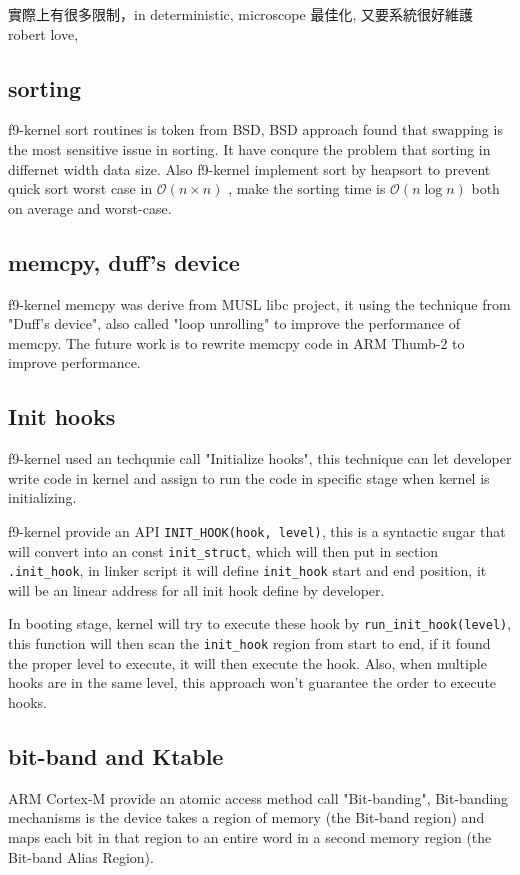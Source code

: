 \documentclass[10pt,preprint,nocopyrightspace]{sigplanconf}
\begin{document}
實際上有很多限制，in deterministic, microscope 最佳化, 又要系統很好維護
robert love,

\subsection{sorting}
f9-kernel sort routines is token from BSD\cite{bentley1993engineering}, BSD approach found that swapping is the most sensitive issue in sorting. It have conqure the problem that sorting in differnet width data size. Also f9-kernel implement sort by heapsort to prevent quick sort worst case in $\mathcal{O}(n \times n)$ , make the sorting time is $\mathcal{O}(n\log{}n)$  both on average and worst-case.

\subsection{memcpy, duff's device}
f9-kernel memcpy was derive from MUSL libc project\cite{felker}, it using the technique from "Duff's device", also called "loop unrolling" to improve the performance of memcpy. The future work is to rewrite memcpy code in ARM Thumb-2 to improve performance.

\subsection{Init hooks}

f9-kernel used an techqunie call "Initialize hooks", this technique can let developer write code in kernel and assign to run the code in specific stage when kernel is initializing.

f9-kernel provide an API \verb|INIT_HOOK(hook, level)|, this is a syntactic sugar that will convert into an const \verb|init_struct|, which will then put in section \verb|.init_hook|, in linker script it will define \verb|init_hook| start and end position, it will be an linear address for all init hook define by developer.

In booting stage, kernel will try to execute these hook by \verb|run_init_hook(level)|, this function will then scan the \verb|init_hook| region from start to end, if it found the proper level to execute, it will then execute the hook. Also, when multiple hooks are in the same level, this approach won't guarantee the order to execute hooks.

\subsection{bit-band and Ktable}
ARM Cortex-M provide an atomic access method call "Bit-banding", Bit-banding mechanisms is the device takes a region of memory (the Bit-band region) and maps each bit in that region to an entire word in a second memory region (the Bit-band Alias Region).\cite{schaenzle2013}
\end{document}
